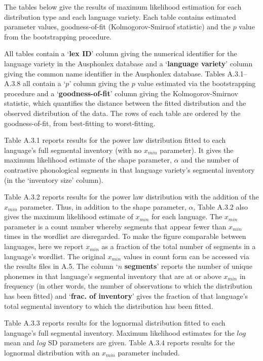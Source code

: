 The tables below give the results of maximum likelihood estimation for
each distribution type and each language variety. Each table contains
estimated parameter values, goodness-of-fit (Kolmogorov-Smirnof
statistic) and the \(p\) value from the bootstrapping procedure.

All tables contain a `\textbf{lex ID}' column giving the numerical
identifier for the language variety in the Ausphonlex database and a
`\textbf{language variety}' column giving the common name identifier in
the Ausphonlex database. Tables A.3.1--A.3.8 all contain a `\(p\)'
column giving the \(p\) value estimated via the bootstrapping procedure
and a `\textbf{goodness-of-fit}' column giving the Kolmogorov-Smirnov
statistic, which quantifies the distance between the fitted distribution
and the observed distribution of the data. The rows of each table are
ordered by the goodness-of-fit, from best-fitting to worst-fitting.

Table A.3.1 reports results for the power law distribution fitted to
each language's full segmental inventory (with no \(x_{min}\)
parameter). It gives the maximum likelihood estimate of the shape
parameter, \(\alpha\) and the number of contrastive phonological
segments in that language variety's segmental inventory (in the
`inventory size' column).

Table A.3.2 reports results for the power law distribution with the
addition of the \(x_{min}\) parameter. Thus, in addition to the shape
parameter, \(\alpha\), Table A.3.2 also gives the maximum likelihood
estimate of \(x_{min}\) for each language. The \(x_{min}\) parameter is
a count number whereby segments that appear fewer than \(x_{min}\) times
in the wordlist are disregarded. To make the figure comparable between
languages, here we report \(x_{min}\) as a fraction of the total number
of segments in a language's wordlist. The original \(x_{min}\) values in
count form can be accessed via the results files in A.5. The column
`\(n\) \textbf{segments}' reports the number of unique phonemes in that
language's segmental inventory that are at or above \(x_{min}\) in
frequency (in other words, the number of observations to which the
distribution has been fitted) and `\textbf{frac. of inventory}' gives
the fraction of that language's total segmental inventory to which the
distribution has been fitted.

Table A.3.3 reports results for the lognormal distribution fitted to
each language's full segmental inventory. Maximum likelihood estimates
for the \(log\) mean and \(log\) SD parameters are given. Table A.3.4
reports results for the lognormal distribution with an \(x_{min}\)
parameter included.

